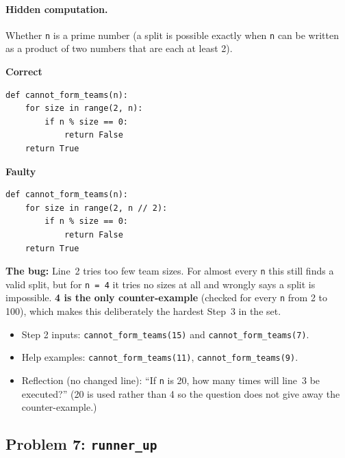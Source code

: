 \documentclass[11pt,a4paper]{article}
\newenvironment{codepair}{\par\noindent}{\par\medskip}
\newcommand{\codelabel}[1]{\textbf{\small #1}\par\vspace{2pt}}
\newcommand{\bugnote}[1]{\par\noindent\textcolor{bugred}{\textbf{The bug:}} #1\par\smallskip}
\begin{document}
\paragraph{Hidden computation.} Whether \texttt{n} is a prime number (a
split is possible exactly when \texttt{n} can be written as a product of
two numbers that are each at least 2).

\begin{codepair}
\begin{minipage}[t]{0.48\textwidth}
\codelabel{Correct}
\begin{lstlisting}
def cannot_form_teams(n):
    for size in range(2, n):
        if n % size == 0:
            return False
    return True
\end{lstlisting}
\end{minipage}\hfill
\begin{minipage}[t]{0.48\textwidth}
\codelabel{Faulty}
\begin{lstlisting}
def cannot_form_teams(n):
    for size in range(2, n // 2):
        if n % size == 0:
            return False
    return True
\end{lstlisting}
\end{minipage}
\end{codepair}

\bugnote{Line~2 tries too few team sizes. For almost every \texttt{n}
this still finds a valid split, but for \texttt{n = 4} it tries no sizes
at all and wrongly says a split is impossible. \textbf{4 is the only
counter-example} (checked for every \texttt{n} from 2 to 100), which makes
this deliberately the hardest Step~3 in the set.}

\begin{itemize}[nosep]
  \item Step 2 inputs: \texttt{cannot\_form\_teams(15)} and
        \texttt{cannot\_form\_teams(7)}.
  \item Help examples: \texttt{cannot\_form\_teams(11)},
        \texttt{cannot\_form\_teams(9)}.
  \item Reflection (no changed line): ``If \texttt{n} is 20, how many
        times will line~3 be executed?'' (20 is used rather than 4 so the
        question does not give away the counter-example.)
\end{itemize}

\subsection{Problem 7: \texttt{runner\_up}}
\end{document}
